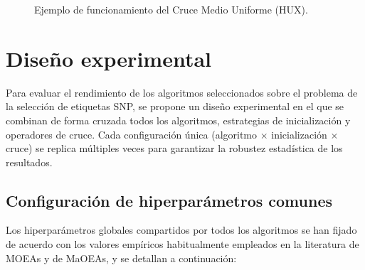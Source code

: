 \begin{itemize}
\begin{figure}[H]
\caption{Ejemplo de funcionamiento del Cruce Medio Uniforme (HUX).}
\label{fig:crossover_hux}
\end{figure}
\end{itemize}

\section{Diseño experimental}

Para evaluar el rendimiento de los algoritmos seleccionados sobre el problema de la selección de etiquetas SNP, se propone un diseño experimental en el que se combinan de forma cruzada todos los algoritmos, estrategias de inicialización y operadores de cruce. Cada configuración única (algoritmo $\times$ inicialización $\times$ cruce) se replica múltiples veces para garantizar la robustez estadística de los resultados.

\subsection{Configuración de hiperparámetros comunes}

Los hiperparámetros globales compartidos por todos los algoritmos se han fijado de acuerdo con los valores empíricos habitualmente empleados en la literatura de MOEAs y de MaOEAs, y se detallan a continuación:

